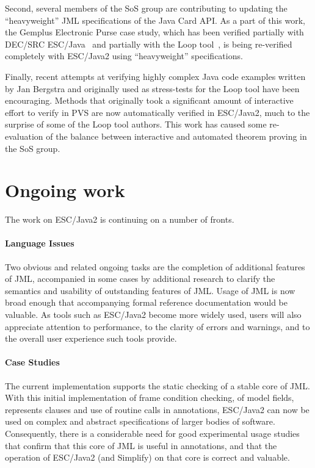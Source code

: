\documentclass{llncs}
\begin{document}
Second, several members of the SoS group are contributing to updating
the ``heavyweight'' JML specifications of the Java Card API.  As a
part of this work, the Gemplus Electronic Purse case study, which has
been verified partially with DEC/SRC ESC/Java~\cite{CatanoHuisman02}
and partially with the Loop tool~\cite{BreunesseJacobsBerg02}, is
being re-verified completely with ESC/Java2 using ``heavyweight''
specifications.

Finally, recent attempts at verifying highly complex Java code
examples written by Jan Bergstra and originally used as stress-tests
for the Loop tool have been encouraging.  Methods that originally took
a significant amount of interactive effort to verify in PVS are now
automatically verified in ESC/Java2, much to the surprise of some of
the Loop tool authors.  This work has caused some re-evaluation of the
balance between interactive and automated theorem proving in the SoS
group.

\section{Ongoing work}
The work on ESC/Java2 is continuing on a number of fronts.

\paragraph*{Language Issues} Two obvious and related ongoing tasks are
the completion of additional features of JML, accompanied in some
cases by additional research to clarify the semantics and usability of
outstanding features of JML.  Usage of JML is now broad enough that
accompanying formal reference documentation would be valuable.  As
tools such as ESC/Java2 become more widely used, users will also
appreciate attention to performance, to the clarity of errors and
warnings, and to the overall user experience such tools provide.

\paragraph*{Case Studies} The current implementation supports the
static checking of a stable core of JML.  With this initial
implementation of frame condition checking, of model fields,
represents clauses and use of routine calls in annotations, ESC/Java2
can now be used on complex and abstract specifications of larger
bodies of software.  Consequently, there is a considerable need for
good experimental usage studies that confirm that this core of JML is
useful in annotations, and that the operation of ESC/Java2 (and
Simplify) on that core is correct and valuable.
\end{document}
